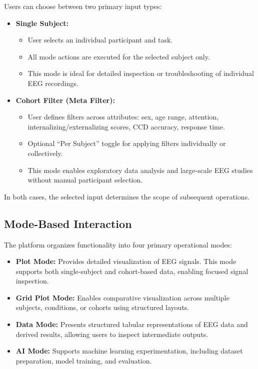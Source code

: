 Users can choose between two primary input types:
\begin{itemize}
    \item \textbf{Single Subject:} 
    \begin{itemize}
        \item User selects an individual participant and task.
        \item All mode actions are executed for the selected subject only.
        \item This mode is ideal for detailed inspection or troubleshooting of individual EEG recordings.
    \end{itemize}
        \item \textbf{Cohort Filter (Meta Filter):} 
    \begin{itemize}
        \item User defines filters across attributes: sex, age range, attention, internalizing/externalizing scores, CCD accuracy, response time.
        \item Optional ``Per Subject'' toggle for applying filters individually or collectively.
        \item This mode enables exploratory data analysis and large-scale EEG studies without manual participant selection.
    \end{itemize}
\end{itemize}

In both cases, the selected input determines the scope of subsequent operations.

\subsection{Mode-Based Interaction}
\label{sec:mode-based-interaction}

The platform organizes functionality into four primary operational modes:

\begin{itemize}
	\item \textbf{Plot Mode:} Provides detailed visualization of EEG signals. This mode supports both single-subject and cohort-based data, enabling focused signal inspection.
    \item \textbf{Grid Plot Mode:} Enables comparative visualization across multiple subjects, conditions, or cohorts using structured layouts.
    \item \textbf{Data Mode:} Presents structured tabular representations of EEG data and derived results, allowing users to inspect intermediate outputs.
	\item \textbf{AI Mode:} Supports machine learning experimentation, including dataset preparation, model training, and evaluation.
\end{itemize}

